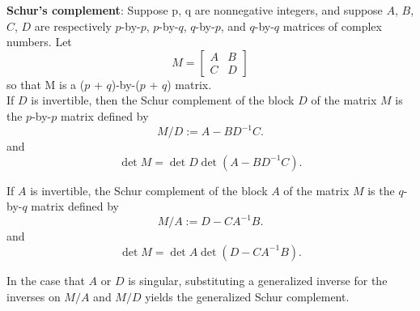 {\bf Schur's complement}:
Suppose p, q are nonnegative integers, and suppose $A$, $B$, $C$, $D$ are respectively $p$-by-$p$, $p$-by-$q$, $q$-by-$p$, and $q$-by-$q$ matrices of complex numbers. Let
\begin{equation}
{\displaystyle M=\left[{\begin{matrix}A&B\\C&D\end{matrix}}\right]}
\end{equation} so that M is a ($p$ + $q$)-by-($p$ + $q$) matrix.\\

If $D$ is invertible, then the Schur complement of the block $D$ of the matrix $M$ is the $p$-by-$p$ matrix defined by
\begin{equation}
{\displaystyle M/D:=A - BD^{-1}C.}\label{M/D}
\end{equation}
and $$\det M = \det D \det (A - BD^{-1}C).$$

If $A$ is invertible, the Schur complement of the block $A$ of the matrix $M$ is the $q$-by-$q$ matrix defined by
\begin{equation}
{\displaystyle M/A:=D - CA^{-1}B.}\label{M/A}
\end{equation}
and $$\det M = \det A \det (D - CA^{-1}B).$$

In the case that $A$ or $D$ is singular, substituting a generalized inverse for the inverses on $M/A$ and $M/D$ yields the generalized Schur complement.\\

